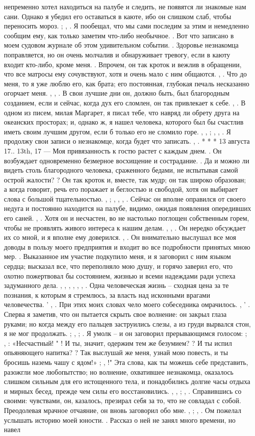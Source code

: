 непременно хотел находиться на палубе и следить, не появятся ли знакомые нам сани. Однако я убедил его оставаться в каюте, ибо он слишком слаб, чтобы переносить мороз. ; , . Я пообещал, что мы сами последим за этим и немедленно сообщим ему, как только заметим что-либо необычное. . Вот что записано в моем судовом журнале об этом удивительном событии. . Здоровье незнакомца поправляется, но он очень молчалив и обнаруживает тревогу, если в каюту входит кто-либо, кроме меня. . Впрочем, он так кроток и вежлив в обращении, что все матросы ему сочувствуют, хотя и очень мало с ним общаются. , . Что до меня, то я уже люблю его, как брата; его постоянная, глубокая печаль несказанно огорчает меня. , , . В свои лучшие дни он, должно быть, был благородным созданием, если и сейчас, когда дух его сломлен, он так привлекает к себе. , . В одном из писем, милая Маргарет, я писал тебе, что навряд ли обрету друга на океанских просторах; и, однако ж, я нашел человека, которого был бы счастлив иметь своим лучшим другом, если б только его не сломило горе. , , ; , , . Я продолжу свои записи о незнакомце, когда будет что записать. , . * * * 13 августа 17.. 13th, 17 — Моя привязанность к гостю растет с каждым днем. . Он возбуждает одновременно безмерное восхищение и сострадание. . Да и можно ли видеть столь благородного человека, сраженного бедами, не испытывая самой острой жалости? ? Он так кроток и, вместе, так мудр; он так широко образован; а когда говорит, речь его поражает и беглостью и свободой, хотя он выбирает слова с большой тщательностью. , ; , , , . Сейчас он вполне оправился от своего недуга и постоянно находится на палубе, видимо, ожидая появления опередивших его саней. , . Хотя он и несчастен, во не настолько поглощен собственным горем, чтобы не проявлять живого интереса к нашим делам. , , . Он нередко обсуждает их со мной, и я вполне ему доверился. , . Он внимательно выслушал все моя доводы в пользу моего предприятия и входит во все подробности принятых мною мер. . Выказанное им участие подкупило меня, и я заговорил с ним языком сердца; высказал все, что переполняло мою душу, и горячо заверил его, что охотно пожертвовал бы состоянием, жизнью и всеми надеждами ради успеха задуманного дела. , , , , , , . Одна человеческая жизнь – сходная цена за те познания, к которым я стремлюсь, за власть над исконными врагами человечества. ' , . При этих моих словах чело моего собеседника омрачилось. , ' . Сперва я заметив, что он пытается скрыть свое волнение: он закрыл глаза руками; но когда между его пальцев заструились слезы, а из груди вырвался стон, я не мог продолжать. ; , ; . Я умолк – и он заговорил прерывающимся голосом: ; , : «Несчастный! " ! И ты, значит, одержим тем же безумием? ? И ты испил опьяняющего напитка? ? Так выслушай же меня, узнай мою повесть, и ты бросишь наземь чашу с ядом!» ; , !" Эта слова, как ты можешь себе представить, разожгли мое любопытство; но волнение, охватившее незнакомца, оказалось слишком сильным для его истощенного тела, и понадобились долгие часы отдыха и мирных бесед, прежде чем силы его восстановились. , , ; , . Справившись со своими: чувствами, он, казалось, презирал себя за то, что не совладал с собой. Преодолевая мрачное отчаяние, он вновь заговорил обо мне. , ; , . Ом пожелал услышать историю моей юности. . Рассказ о ней не занял много времени, но навел 